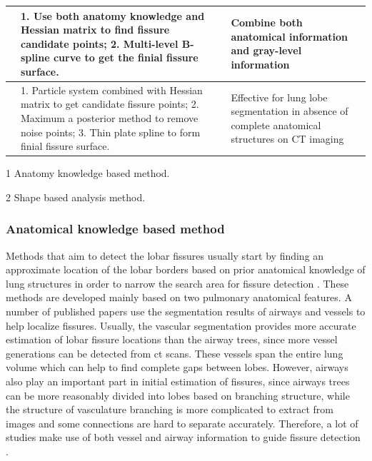\begin{table}[htbp]
\begin{threeparttable}
\begin{tabular}{|p{4.3cm}|p{6.3cm}|p{4.8cm}|}
\hline
\cite{doel2012pulmonary} & 1. Use both anatomy knowledge and Hessian matrix to find fissure candidate points; 2. Multi-level B-spline curve to get the finial fissure surface. & Combine both anatomical information and gray-level information\tnote{1,2}\\
\hline
\cite{ross2010automatic,ross2013pulmonary} & 1. Particle system combined with Hessian matrix to get candidate fissure points; 2. Maximum a posterior method to remove noise points; 3. Thin plate spline to form finial fissure surface. & Effective for lung lobe segmentation in absence of complete anatomical structures on CT imaging\tnote{2}\\
\hline
\end{tabular}
\begin{tablenotes}
        \footnotesize
        \item[1] Anatomy knowledge based method.
        \item[2] Shape based analysis method.
\end{tablenotes}
\end{threeparttable}
\end{table}

\subsubsection{Anatomical knowledge based method}
Methods that aim to detect the lobar fissures usually start by finding an approximate location of the lobar borders based on prior anatomical knowledge of lung structures in order to narrow the search area for fissure detection \citep{kuhnigk2003lung,kuhnigk2005informatics,zhou2004automatic,saita2006algorithm,zhang2006atlas,ukil2009anatomy,pu2009computational,lassen2010automatic,doel2012pulmonary}. These methods are developed mainly based on two pulmonary anatomical features. A number of published papers use the segmentation results of airways and vessels to help localize fissures. Usually, the vascular segmentation provides more accurate estimation of lobar fissure locations than the airway trees, since more vessel generations can be detected from \gls{ct} scans. These vessels span the entire lung volume which can help to find complete gaps between lobes. However, airways also play an important part in initial estimation of fissures, since airways trees can be more reasonably divided into lobes based on branching structure, while the structure of vasculature branching is more complicated to extract from images and some connections are hard to separate accurately. Therefore, a lot of studies make use of both vessel and airway information to guide fissure detection \citep{ukil2009anatomy,lassen2010automatic,doel2012pulmonary}.

